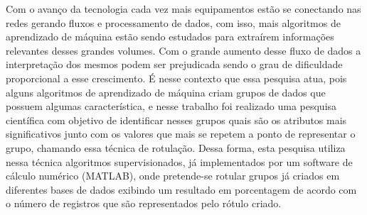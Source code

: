 
\setlength{\absparsep}{18pt} %
\begin{resumo}

Com o avanço da tecnologia cada vez mais equipamentos estão se conectando nas redes gerando fluxos e processamento de dados, com isso, mais algoritmos de aprendizado de máquina estão sendo estudados para extraírem informações relevantes desses grandes volumes. Com o grande aumento desse fluxo de dados a interpretação dos mesmos podem ser prejudicada sendo o grau de dificuldade proporcional a esse crescimento. É nesse contexto que essa pesquisa atua, pois alguns algoritmos de aprendizado de máquina criam grupos de dados que possuem algumas característica, e nesse trabalho foi realizado uma pesquisa científica com objetivo de identificar nesses grupos quais são os atributos mais significativos junto com os valores que mais se repetem a ponto de representar o grupo, chamando essa técnica de rotulação. Dessa forma, esta pesquisa utiliza nessa técnica algoritmos supervisionados, já implementados por um software de cálculo numérico (MATLAB), onde pretende-se rotular grupos já criados em diferentes bases de dados exibindo um resultado em porcentagem de acordo com o número de registros que são representados pelo rótulo criado.


\end{resumo}
